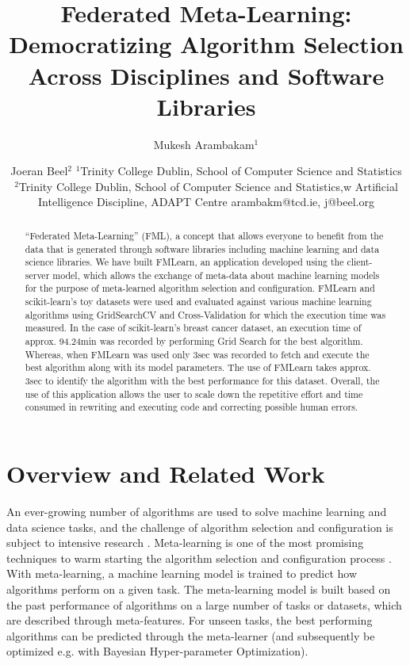 \documentclass{article}
\title{Federated Meta-Learning: Democratizing Algorithm Selection Across Disciplines and Software Libraries}
\author{
Mukesh Arambakam$^1$
\and
Joeran Beel$^2$
\affiliations
$^1$Trinity College Dublin,
School of Computer Science and Statistics\\
$^2$Trinity College Dublin,
School of Computer Science and Statistics,w
Artificial Intelligence Discipline,
ADAPT Centre
\emails
arambakm@tcd.ie,
j@beel.org
}
\begin{document}
\maketitle

\begin{abstract}
“Federated Meta-Learning” (FML), a concept that allows everyone to benefit from the data that is generated through software libraries including machine learning and data science libraries. We have built FMLearn, an application developed using the client-server model, which allows the exchange of meta-data about machine learning models for the purpose of meta-learned algorithm selection and configuration. FMLearn and scikit-learn’s toy datasets were used and evaluated against various machine learning algorithms using GridSearchCV and Cross-Validation for which the execution time was measured. In the case of scikit-learn’s breast cancer dataset, an execution time of approx. 94.24min was recorded by performing Grid Search for the best algorithm. Whereas, when FMLearn was used only 3sec was recorded to fetch and execute the best algorithm along with its model parameters. The use of FMLearn takes approx. 3sec to identify the algorithm with the best performance for this dataset. Overall, the use of this application allows the user to scale down the repetitive effort and time consumed in rewriting and executing code and correcting possible human errors.
\end{abstract}

\section{Overview and Related Work}
An ever-growing number of algorithms are used to solve machine learning and data science tasks, and the challenge of algorithm selection and configuration is subject to intensive research \cite{bischl-et-al,brazdil:p,calandra-et-al,collins-et-al2018,romero-et-al,vartak-et-al}. Meta-learning is one of the most promising techniques to warm starting the algorithm selection and configuration process \cite{hutter-et-al}. With meta-learning, a machine learning model is trained to predict how algorithms perform on a given task. The meta-learning model is built based on the past performance of algorithms on a large number of tasks or datasets, which are described through meta-features. For unseen tasks, the best performing algorithms can be predicted through the meta-learner (and subsequently be optimized e.g. with Bayesian Hyper-parameter Optimization).
\end{document}
